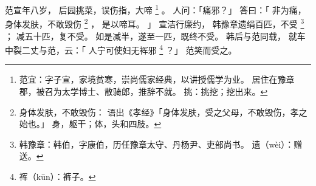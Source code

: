 
\switchcolumn*[\section{}]

范宣年八岁，
后园挑菜，误伤指，大啼%
\footnote{%
    范宜：字子宣，家境贫寒，崇尚儒家经典，以讲授儒学为业。
          居住在豫章郡，被召为太学博士、散骑郎，推辞不就。
    挑：挑挖；挖出来。
}%
。
人问：「痛邪？」
答曰：「
    非为痛，
    身体发肤，不敢毁伤%
    \footnote{%
        身体发肤，不敢毁伤：
            语出《孝经》「身体发肤，受之父母，不敢毁伤，孝之始也。」
            身，躯干；体，头和四肢。
    }%
    ，
    是以啼耳。
」
宣洁行廉约，
韩豫章遗绢百匹，不受%
\footnote{%
    韩豫章：韩伯，字康伯，历任豫章太守、丹杨尹、吏部尚书。
    遗（wèi）：赠送。
}%
；
减五十匹，复不受。
如是减半，遂至一匹，既终不受。
韩后与范同载，
就车中裂二丈与范，云：「
    人宁可使妇无裈邪%
    \footnote{%
        裈（kūn）：裤子。
    }%
？」
范笑而受之。

\switchcolumn



